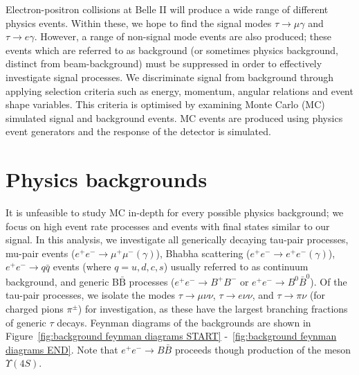 \documentclass[12pt]{thesis}  %
\begin{document}
Electron-positron collisions at Belle II will produce a wide range of different physics events. Within these, we hope to find the signal modes $\tau\to\mu\gamma$ and $\tau\to e\gamma$. However, a range of non-signal mode events are also produced; these events which are referred to as background (or sometimes physics background, distinct from beam-background) must be suppressed in order to effectively investigate signal processes. We discriminate signal from background through applying selection criteria such as energy, momentum, angular relations and event shape variables. This criteria is optimised by examining Monte Carlo (MC) simulated signal and background events. MC events are produced using physics event generators and the response of the detector is simulated.

\section{Physics backgrounds}

It is unfeasible to study MC in-depth for every possible physics background; we focus on high event rate processes and events with final states similar to our signal. In this analysis, we investigate all generically decaying tau-pair processes, mu-pair events ($e^+ e^- \to \mu^+ \mu^- (\gamma)$), Bhabha scattering ($e^+ e^- \to e^+ e^- (\gamma)$), $e^+ e^- \to q\bar{q}$ events (where $q = u, d, c, s$) usually referred to as continuum background, and generic B$\bar{\text{B}}$ processes ($e^+ e^- \to B^+ B^-$ or $e^+ e^- \to B^0 \bar{B}^0$). Of the tau-pair processes, we isolate the modes $\tau \to \mu \nu \nu$, $\tau \to e \nu \nu$, and $\tau \to \pi \nu$ (for charged pions $\pi^{\pm}$) for investigation, as these have the largest branching fractions of generic $\tau$ decays. Feynman diagrams of the backgrounds are shown in Figure~\ref{fig:background feynman diagrams START} -~\ref{fig:background feynman diagrams END}. Note that $e^+ e^- \to B\bar{B}$ proceeds though production of the meson $\Upsilon(4S)$.
\end{document}
